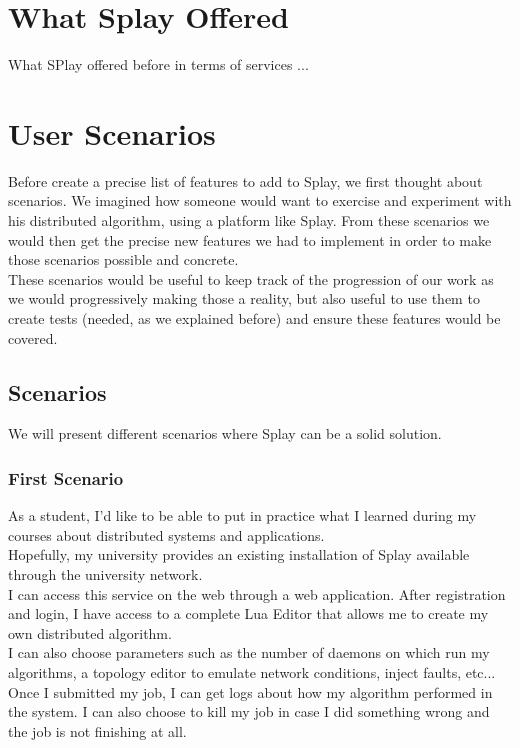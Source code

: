 \documentclass{eplmastersthesis}
\begin{document}
    \section{What Splay Offered} %

      What SPlay offered before in terms of services ...

    \section{User Scenarios}

      Before create a precise list of features to add to Splay, we first
      thought about scenarios. We imagined how someone would want to exercise
      and experiment with his distributed algorithm, using a platform like
      Splay. From these scenarios we would then get the precise new features
      we had to implement in order to make those scenarios possible and
      concrete.\\

      These scenarios would be useful to keep track of the progression of our
      work as we would progressively making those a reality, but also useful
      to use them to create tests (needed, as we explained before) and ensure
      these features would be covered.

      \subsection{Scenarios}

        We will present different scenarios where Splay can be a solid solution.

        \subsubsection{First Scenario}

          As a student, I'd like to be able to put in practice what I learned
          during my courses about distributed systems and applications.\\
          Hopefully, my university provides an existing installation of Splay
          available through the university network.\\
          I can access this service on the web through a web application. After
          registration and login, I have access to a complete Lua Editor that
          allows me to create my own distributed algorithm.\\
          I can also choose parameters such as the number of daemons on
          which run my algorithms, a topology editor to emulate network
          conditions, inject faults, etc...\\
          Once I submitted my job, I can get logs about how my algorithm
          performed in the system. I can also choose to kill my job in case
          I did something wrong and the job is not finishing at all.
\end{document}
